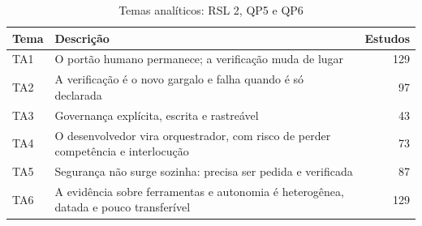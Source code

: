 \begin{table}[htbp]
\centering
\caption{Temas analíticos: RSL 2, QP5 e QP6}
\label{tab:temas-B4}
\small
\begin{tabular}{lp{11cm}r}
\hline
\textbf{Tema} & \textbf{Descrição} & \textbf{Estudos} \\
\hline
TA1 & O portão humano permanece; a verificação muda de lugar & 129 \\
TA2 & A verificação é o novo gargalo e falha quando é só declarada & 97 \\
TA3 & Governança explícita, escrita e rastreável & 43 \\
TA4 & O desenvolvedor vira orquestrador, com risco de perder competência e interlocução & 73 \\
TA5 & Segurança não surge sozinha: precisa ser pedida e verificada & 87 \\
TA6 & A evidência sobre ferramentas e autonomia é heterogênea, datada e pouco transferível & 129 \\
\hline
\end{tabular}
\end{table}

